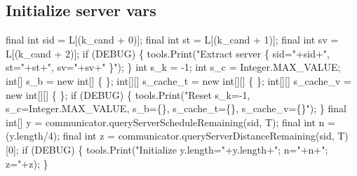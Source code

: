 \documentclass{article}
\def\nwendcode{\endtrivlist \endgroup}      %
\let\nwdocspar=\par
\begin{document}
\subsection{Initialize server vars}
\nwenddocs{}\endmoddef{}
final int sid = L[(k_cand + 0)];
final int st  = L[(k_cand + 1)];
final int sv  = L[(k_cand + 2)];
if (DEBUG) \{
  tools.Print("Extract server \{ sid="+sid+", st="+st+", sv="+sv+" \}");
\}
int     s_k       = -1;
int     s_c       = Integer.MAX_VALUE;
int[]   s_b       = new int[] \{ \};
int[][] s_cache_t = new int[][] \{ \};
int[][] s_cache_v = new int[][] \{ \};
if (DEBUG) \{
  tools.Print("Reset s_k=-1, s_c=Integer.MAX_VALUE, s_b=\{\}, s_cache_t=\{\}, s_cache_v=\{\}");
\}
final int[] y = communicator.queryServerScheduleRemaining(sid, T);
final int   n = (y.length/4);
final int   z = communicator.queryServerDistanceRemaining(sid, T)[0];
if (DEBUG) \{
  tools.Print("Initialize y.length="+y.length+"; n="+n+"; z="+z);
\}
\eatline
{}\nwendcode{}\nwdocspar
\end{document}
